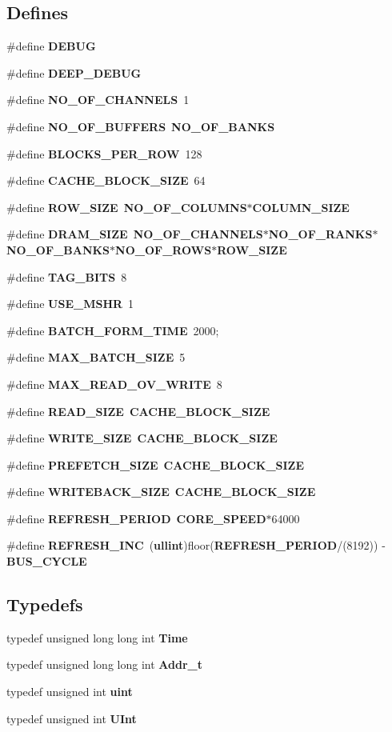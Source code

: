\subsection*{Defines}
\begin{CompactItemize}
\item 
\#define {\bf DEBUG}
\item 
\#define {\bf DEEP\_\-DEBUG}
\item 
\#define {\bf NO\_\-OF\_\-CHANNELS}~1
\item 
\#define {\bf NO\_\-OF\_\-BUFFERS}~{\bf NO\_\-OF\_\-BANKS}
\item 
\#define {\bf BLOCKS\_\-PER\_\-ROW}~128
\item 
\#define {\bf CACHE\_\-BLOCK\_\-SIZE}~64
\item 
\#define {\bf ROW\_\-SIZE}~{\bf NO\_\-OF\_\-COLUMNS}$\ast${\bf COLUMN\_\-SIZE}
\item 
\#define {\bf DRAM\_\-SIZE}~{\bf NO\_\-OF\_\-CHANNELS}$\ast${\bf NO\_\-OF\_\-RANKS}$\ast${\bf NO\_\-OF\_\-BANKS}$\ast${\bf NO\_\-OF\_\-ROWS}$\ast${\bf ROW\_\-SIZE}
\item 
\#define {\bf TAG\_\-BITS}~8
\item 
\#define {\bf USE\_\-MSHR}~1
\item 
\#define {\bf BATCH\_\-FORM\_\-TIME}~2000;
\item 
\#define {\bf MAX\_\-BATCH\_\-SIZE}~5
\item 
\#define {\bf MAX\_\-READ\_\-OV\_\-WRITE}~8
\item 
\#define {\bf READ\_\-SIZE}~{\bf CACHE\_\-BLOCK\_\-SIZE}
\item 
\#define {\bf WRITE\_\-SIZE}~{\bf CACHE\_\-BLOCK\_\-SIZE}
\item 
\#define {\bf PREFETCH\_\-SIZE}~{\bf CACHE\_\-BLOCK\_\-SIZE}
\item 
\#define {\bf WRITEBACK\_\-SIZE}~{\bf CACHE\_\-BLOCK\_\-SIZE}
\item 
\#define {\bf REFRESH\_\-PERIOD}~{\bf CORE\_\-SPEED}$\ast$64000
\item 
\#define {\bf REFRESH\_\-INC}~({\bf ullint})floor({\bf REFRESH\_\-PERIOD}/(8192)) - {\bf BUS\_\-CYCLE}
\end{CompactItemize}
\subsection*{Typedefs}
\begin{CompactItemize}
\item 
typedef unsigned long long int {\bf Time}
\item 
typedef unsigned long long int {\bf Addr\_\-t}
\item 
typedef unsigned int {\bf uint}
\item 
typedef unsigned int {\bf UInt}
\end{CompactItemize}
